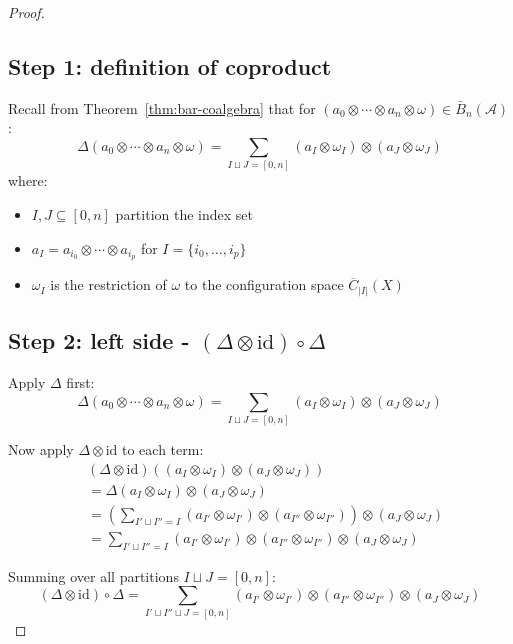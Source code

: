 \begin{proof}

\subsection*{Step 1: definition of coproduct}

Recall from Theorem~\ref{thm:bar-coalgebra} that for $(a_0 \otimes \cdots \otimes a_n \otimes \omega) \in \bar{B}_n(\mathcal{A})$:
\[\Delta(a_0 \otimes \cdots \otimes a_n \otimes \omega) = \sum_{I \sqcup J = [0,n]} (a_I \otimes \omega_I) \otimes (a_J \otimes \omega_J)\]
where:
\begin{itemize}
\item $I, J \subseteq [0,n]$ partition the index set
\item $a_I = a_{i_0} \otimes \cdots \otimes a_{i_p}$ for $I = \{i_0, \ldots, i_p\}$
\item $\omega_I$ is the restriction of $\omega$ to the configuration space $\overline{C}_{|I|}(X)$
\end{itemize}

\subsection*{Step 2: left side - $(\Delta \otimes \text{id}) \circ \Delta$}

Apply $\Delta$ first:
\[\Delta(a_0 \otimes \cdots \otimes a_n \otimes \omega) = \sum_{I \sqcup J = [0,n]} (a_I \otimes \omega_I) \otimes (a_J \otimes \omega_J)\]

Now apply $\Delta \otimes \text{id}$ to each term:
\begin{align*}
&(\Delta \otimes \text{id})\left((a_I \otimes \omega_I) \otimes (a_J \otimes \omega_J)\right) \\
&= \Delta(a_I \otimes \omega_I) \otimes (a_J \otimes \omega_J) \\
&= \left(\sum_{I' \sqcup I'' = I} (a_{I'} \otimes \omega_{I'}) \otimes (a_{I''} \otimes \omega_{I''})\right) \otimes (a_J \otimes \omega_J) \\
&= \sum_{I' \sqcup I'' = I} (a_{I'} \otimes \omega_{I'}) \otimes (a_{I''} \otimes \omega_{I''}) \otimes (a_J \otimes \omega_J)
\end{align*}

Summing over all partitions $I \sqcup J = [0,n]$:
\[(\Delta \otimes \text{id}) \circ \Delta = \sum_{I' \sqcup I'' \sqcup J = [0,n]} (a_{I'} \otimes \omega_{I'}) \otimes (a_{I''} \otimes \omega_{I''}) \otimes (a_J \otimes \omega_J)\]


\end{proof}
